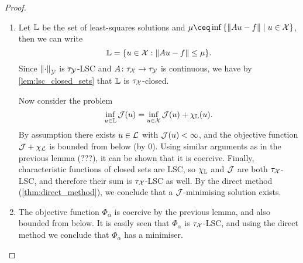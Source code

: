 \begin{proof}
	\begin{enumerate}
		\item Let $\mathbb L$ be the set of least-squares solutions and $\mu \ceq \inf\qty{\norm{Au - f} \mid u \in \XX}$, then we can write
		\[
		\mathbb L = \qty{u \in \mathcal X: \norm{Au - f} \leq \mu}. 
		\]
		Since $\norm{\cdot}_\mathcal Y$ is $\tau_\mathcal Y$-LSC and $A \colon \tau_\mathcal X \to \tau_\mathcal Y$ is continuous, we have by \cref{lem:lsc_closed_sets} that $\mathbb L$ is $\tau_\mathcal X$-closed.
		
		Now consider the problem 
		\[
		\inf_{u \in \mathbb L} \mathcal J(u) = \inf_{u \in \mathcal X} \mathcal J(u) + \chi_\mathbb L(u). 
		\] 
		By assumption there exists $u \in \mathcal L$ with $\mathcal J(u) < \infty$, and the objective function $\mathcal J + \chi_\mathcal L$ is bounded from below (by 0). Using similar arguments as in the previous lemma (???), it can be shown that it is coercive. Finally, characteristic functions of closed sets are LSC, so $\chi_\mathbb L$ and $\mathcal J$ are both $\tau_\mathcal X$-LSC, and therefore their sum is $\tau_\mathcal X$-LSC as well. By the direct method (\cref{thm:direct_method}), we conclude that a $\mathcal J$-minimising solution exists. 
		
		\item The objective function $\Phi_\alpha$ is coercive by the previous lemma, and also bounded from below. It is easily seen that $\Phi_\alpha$ is $\tau_\mathcal X$-LSC, and using the direct method we conclude that $\Phi_\alpha$ has a minimiser. 
	\end{enumerate}
\end{proof}

